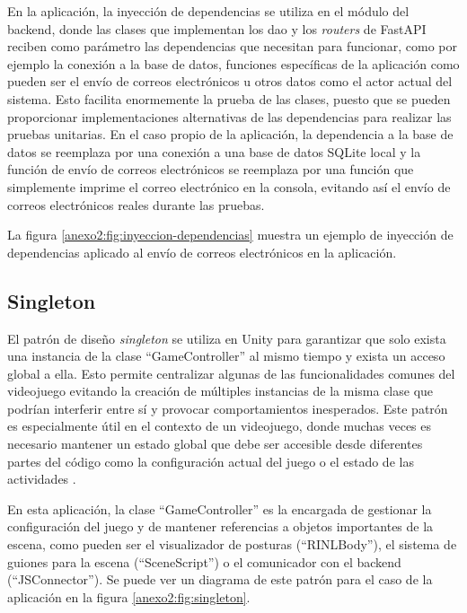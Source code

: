 En la aplicación, la inyección de dependencias se utiliza en el módulo del
\gls{backend}, donde las clases que implementan los \gls{dao} y los
\textit{routers} de FastAPI reciben como parámetro las dependencias que
necesitan para funcionar, como por ejemplo la conexión a la base de datos,
funciones específicas de la aplicación como pueden ser el envío de correos
electrónicos u otros datos como el actor actual del sistema. Esto facilita
enormemente la prueba de las clases, puesto que se pueden proporcionar
implementaciones alternativas de las dependencias para realizar las pruebas
unitarias. En el caso propio de la aplicación, la dependencia a la base de datos
se reemplaza por una conexión a una base de datos SQLite local y la función de
envío de correos electrónicos se reemplaza por una función que simplemente
imprime el correo electrónico en la consola, evitando así el envío de correos
electrónicos reales durante las pruebas.

La figura \ref{anexo2:fig:inyeccion-dependencias} muestra un ejemplo de
inyección de dependencias aplicado al envío de correos electrónicos en la
aplicación.


\subsection{Singleton}
\label{anexo2:sec:singleton}
El patrón de diseño \textit{singleton} se utiliza en Unity para garantizar que solo exista una instancia de
la clase \enquote{GameController} al mismo tiempo y exista un acceso global a ella. Esto permite
centralizar algunas de las funcionalidades comunes del videojuego evitando la creación de múltiples
instancias de la misma clase que podrían interferir entre sí y provocar comportamientos inesperados.
Este patrón es especialmente útil en el contexto de un videojuego, donde muchas veces es necesario
mantener un estado global que debe ser accesible desde diferentes partes del código como la configuración
actual del juego o el estado de las actividades \parencite{GameProgrammingPatterns}.

En esta aplicación, la clase \enquote{GameController} es la encargada de gestionar la configuración del
juego y de mantener referencias a objetos importantes de la escena, como pueden ser el visualizador de
posturas (\enquote{RINLBody}), el sistema de guiones para la escena (\enquote{SceneScript}) o el
comunicador con el \gls{backend} (\enquote{JSConnector}). Se puede ver un diagrama de este patrón para
el caso de la aplicación en la figura \ref{anexo2:fig:singleton}.

